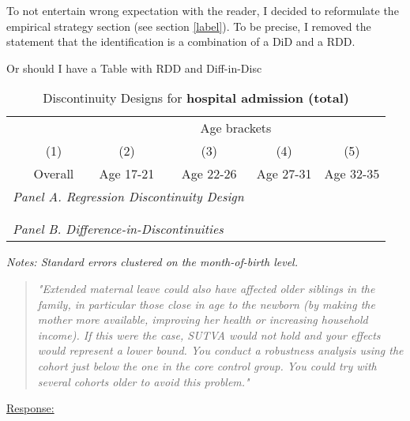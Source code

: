 To not entertain wrong expectation with the reader, I decided to reformulate the empirical strategy section (see section \ref{label}). To be precise, I removed 
the statement that the identification is a combination of a DiD and a RDD. 





Or should I have a Table with RDD and Diff-in-Disc
\begin{table}[H] \centering 
	\begin{threeparttable} \centering \caption{Discontinuity Designs for \textbf{hospital admission (total)}}\label{tab_mlch: revision_RDD_DiffDisc_hopsital2_total}
		{\def\sym#1{\ifmmode^{#1}\else\(^{#1}\)\fi} 
			\begin{tabular}{l*{5}{c}}
				\toprule 
				& & \multicolumn{4}{c}{Age brackets} \\ 
				\cmidrule(lr){3-6}
				&\multicolumn{1}{c}{(1)}&\multicolumn{1}{c}{(2)}&\multicolumn{1}{c}{(3)}&\multicolumn{1}{c}{(4)}&\multicolumn{1}{c}{(5)}\\
				&\multicolumn{1}{c}{Overall}&\multicolumn{1}{c}{Age 17-21}&\multicolumn{1}{c}{Age 22-26}&\multicolumn{1}{c}{Age 27-31} &\multicolumn{1}{c}{Age 32-35}\\
				\midrule
				\multicolumn{4}{l}{\emph{Panel A. Regression Discontinuity Design}} \\
				 \\ \\
				
				\multicolumn{4}{l}{\emph{Panel B. Difference-in-Discontinuities}} \\
				 
				\bottomrule 
		\end{tabular}}
		\begin{tablenotes} 
			\item \scriptsize \emph{Notes: Standard errors clustered on the month-of-birth level.} 
		\end{tablenotes} 
	\end{threeparttable} 
\end{table}






\bigskip
\begin{quote}
	\textit{"Extended maternal leave could also have affected older siblings in the family, in particular those close in age to the newborn (by making the mother more available, improving her health or increasing household income). If this were the case, SUTVA would not hold and your effects would represent a lower bound. You conduct a robustness analysis using the cohort just below the one in the core control group. You could try with several cohorts older to avoid this problem."}
\end{quote}
\underline{Response:}

